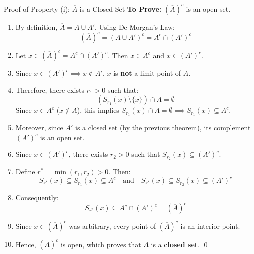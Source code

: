\documentclass[11pt,a4paper]{article}
\begin{document}
\begin{exbox}{Proof of Property (i): $\overline{A}$ is a Closed Set}
\textbf{To Prove:} $(\overline{A})^c$ is an open set.
\begin{enumerate}
    \item By definition, $\overline{A} = A \cup A'$. Using De Morgan's Law:
    \begin{equation}
        (\overline{A})^c = (A \cup A')^c = A^c \cap (A')^c
    \end{equation}
    \item Let $x \in (\overline{A})^c = A^c \cap (A')^c$. Then $x \in A^c$ and $x \in (A')^c$.
    \item Since $x \in (A')^c \implies x \notin A'$, $x$ is \textbf{not} a limit point of $A$.
    \item Therefore, there exists $r_1 > 0$ such that:
    \begin{equation}
        (S_{r_1}(x) \setminus \{x\}) \cap A = \emptyset
    \end{equation}
    Since $x \in A^c$ ($x \notin A$), this implies $S_{r_1}(x) \cap A = \emptyset \implies S_{r_1}(x) \subseteq A^c$.
    \item Moreover, since $A'$ is a closed set (by the previous theorem), its complement $(A')^c$ is an open set.
    \item Since $x \in (A')^c$, there exists $r_2 > 0$ such that $S_{r_2}(x) \subseteq (A')^c$.
    \item Define $r^* = \min(r_1, r_2) > 0$. Then:
    \begin{equation}
        S_{r^*}(x) \subseteq S_{r_1}(x) \subseteq A^c \quad \text{and} \quad S_{r^*}(x) \subseteq S_{r_2}(x) \subseteq (A')^c
    \end{equation}
    \item Consequently:
    \begin{equation}
        S_{r^*}(x) \subseteq A^c \cap (A')^c = (\overline{A})^c
    \end{equation}
    \item Since $x \in (\overline{A})^c$ was arbitrary, every point of $(\overline{A})^c$ is an interior point.
    \item Hence, $(\overline{A})^c$ is open, which proves that $\overline{A}$ is a \textbf{closed set}. \qed
\end{enumerate}
\end{exbox}

\newpage
\end{document}
